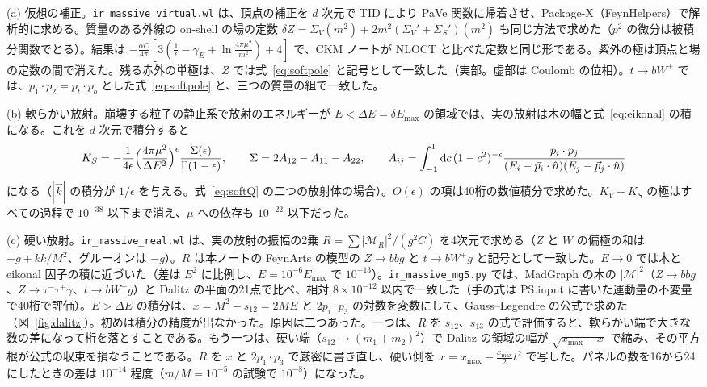 \documentclass[a4paper,10pt]{ltjsarticle}
\newcommand{\dd}{\mathrm{d}}
\begin{document}
(a) 仮想の補正。\texttt{ir\_massive\_virtual.wl} は、頂点の補正を $d$ 次元で TID により PaVe 関数に帰着させ、Package-X（FeynHelpers）で解析的に求める。質量のある外線の on-shell の場の定数 $\delta Z=\Sigma_V(m^2)+2m^2(\Sigma_V'+\Sigma_S')(m^2)$ も同じ方法で求めた（$p^2$ の微分は被積分関数でとる）。結果は $-\frac{\alpha C}{4\pi}[3(\frac1\epsilon-\gamma_E+\ln\frac{4\pi\mu^2}{m^2})+4]$ で、CKM ノートが NLOCT と比べた定数と同じ形である。紫外の極は頂点と場の定数の間で消えた。残る赤外の単極は、$Z$ では式~\eqref{eq:softpole} と記号として一致した（実部。虚部は Coulomb の位相）。$t\to bW^+$ では、$p_1\cdot p_2=p_t\cdot p_b$ とした式~\eqref{eq:softpole} と、三つの質量の組で一致した。

(b) 軟らかい放射。崩壊する粒子の静止系で放射のエネルギーが $E<\Delta E=\delta E_{\max}$ の領域では、実の放射は木の幅と式~\eqref{eq:eikonal} の積になる。これを $d$ 次元で積分すると
\begin{equation*}
K_S=-\frac1{4\epsilon}\Bigl(\frac{4\pi\mu^2}{\Delta E^2}\Bigr)^\epsilon\frac{\Sigma(\epsilon)}{\Gamma(1-\epsilon)},\qquad
\Sigma=2A_{12}-A_{11}-A_{22},\qquad A_{ij}=\int_{-1}^1\dd c\,(1-c^2)^{-\epsilon}\frac{p_i\cdot p_j}{(E_i-\vec p_i\cdot\hat n)(E_j-\vec p_j\cdot\hat n)}
\end{equation*}
になる（$|\vec k|$ の積分が $1/\epsilon$ を与える。式~\eqref{eq:softQ} の二つの放射体の場合）。$O(\epsilon)$ の項は40桁の数値積分で求めた。$K_V+K_S$ の極はすべての過程で $10^{-38}$ 以下まで消え、$\mu$ への依存も $10^{-22}$ 以下だった。

(c) 硬い放射。\texttt{ir\_massive\_real.wl} は、実の放射の振幅の2乗 $R=\sum|\mathcal M_R|^2/(g^2C)$ を4次元で求める（$Z$ と $W$ の偏極の和は $-g+kk/M^2$、グルーオンは $-g$）。$R$ は本ノートの FeynArts の模型の $Z\to b\bar bg$ と $t\to bW^+g$ と記号として一致した。$E\to0$ では木と eikonal 因子の積に近づいた（差は $E^2$ に比例し、$E=10^{-6}E_{\max}$ で $10^{-13}$）。\texttt{ir\_massive\_mg5.py} では、MadGraph の木の $|\mathcal M|^2$（$Z\to b\bar bg$、$Z\to\tau^-\tau^+\gamma$、$t\to bW^+g$）と Dalitz の平面の21点で比べ、相対 $8\times10^{-12}$ 以内で一致した（手の式は PS.input に書いた運動量の不変量で40桁で評価）。$E>\Delta E$ の積分は、$x=M^2-s_{12}=2ME$ と $2p_i\cdot p_3$ の対数を変数にして、Gauss--Legendre の公式で求めた（図~\ref{fig:dalitz}）。初めは積分の精度が出なかった。原因は二つあった。一つは、$R$ を $s_{12}$、$s_{13}$ の式で評価すると、軟らかい端で大きな数の差になって桁を落とすことである。もう一つは、硬い端（$s_{12}\to(m_1+m_2)^2$）で Dalitz の領域の幅が $\sqrt{x_{\max}-x}$ で縮み、その平方根が公式の収束を損なうことである。$R$ を $x$ と $2p_1\cdot p_3$ で厳密に書き直し、硬い側を $x=x_{\max}-\frac{x_{\max}}2t^2$ で写した。パネルの数を16から24にしたときの差は $10^{-14}$ 程度（$m/M=10^{-5}$ の試験で $10^{-8}$）になった。
\end{document}
